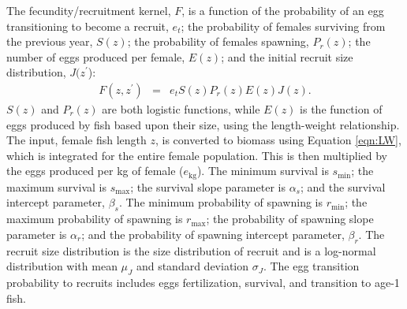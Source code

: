 \documentclass{article}[12pt]
\begin{document}
The  fecundity/recruitment kernel, \(F\),  is a function of the probability of 
an egg transitioning to become a recruit, \(e_t\);
the probability of females surviving from the previous year, \(S(z)\);
the probability of females spawning, \(P_r(z)\);
the number of eggs produced per female, \(E(z)\); and 
the initial recruit size distribution, \(J(z^\prime\)):
\begin{eqnarray}
F(z, z^\prime) &=& e_t S(z) P_r(z) E(z) J(z).\label{eqn:Fec}
\end{eqnarray}
\(S(z)\) and \(P_r(z)\) are both logistic functions, while
\(E(z)\) is the function of eggs produced by fish based upon their size, using the length-weight relationship. 
The input, female fish length \(z\), is converted to biomass using Equation \ref{eqn:LW}, which is integrated for the entire female population.
This is then multiplied by the eggs produced per kg of female (\(e_\text{kg}\)).  
The minimum survival is \(s_\text{min}\);
the maximum survival is \(s_\text{max}\);
the survival slope parameter is \(\alpha_s\);  and
the survival intercept parameter, \(\beta_s\).
The minimum probability of spawning is \(r_\text{min}\);
the maximum probability of spawning is \(r_\text{max}\);
the probability of spawning slope parameter is \(\alpha_r\);  and
the probability of spawning intercept parameter, \(\beta_r\).
The recruit size distribution is the size distribution of recruit and is a log-normal distribution with mean \(\mu_J\) and standard deviation \(\sigma_J\).
The egg transition probability to recruits includes  eggs fertilization, survival, and transition to age-1 fish.
\end{document}

